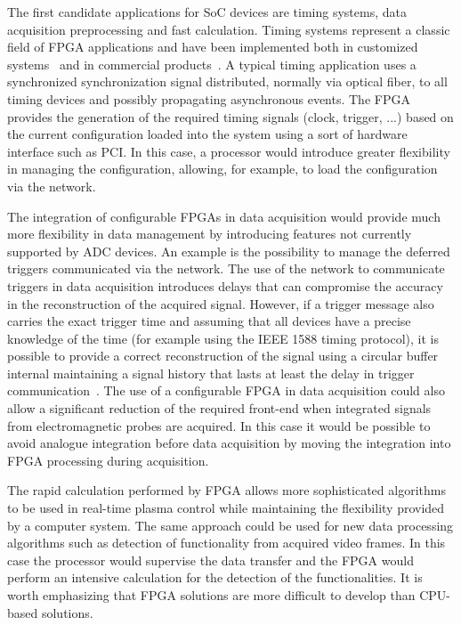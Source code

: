 The first candidate applications for SoC devices are timing systems, data acquisition preprocessing and fast calculation. Timing systems represent a classic field of FPGA applications and have been implemented both in customized systems~\cite{ana_9} and in commercial products~\cite{ana_10}. A typical timing application uses a synchronized synchronization signal distributed, normally via optical fiber, to all timing devices and possibly propagating asynchronous events. The FPGA provides the generation of the required timing signals (clock, trigger, ...) based on the current configuration loaded into the system using a sort of hardware interface such as PCI. In this case, a processor would introduce greater flexibility in managing the configuration, allowing, for example, to load the configuration via the network.

The integration of configurable FPGAs in data acquisition would provide much more flexibility in data management by introducing features not currently supported by ADC devices. An example is the possibility to manage the deferred triggers communicated via the network. The use of the network to communicate triggers in data acquisition introduces delays that can compromise the accuracy in the reconstruction of the acquired signal. However, if a trigger message also carries the exact trigger time and assuming that all devices have a precise knowledge of the time (for example using the IEEE 1588 timing protocol), it is possible to provide a correct reconstruction of the signal using a circular buffer internal maintaining a signal history that lasts at least the delay in trigger communication~\cite{ana_11}. The use of a configurable FPGA in data acquisition could also allow a significant reduction of the required front-end when integrated signals from electromagnetic probes are acquired. In this case it would be possible to avoid analogue integration before data acquisition by moving the integration into FPGA processing during acquisition.

The rapid calculation performed by FPGA allows more sophisticated algorithms to be used in real-time plasma control while maintaining the flexibility provided by a computer system. The same approach could be used for new data processing algorithms such as detection of functionality from acquired video frames. In this case the processor would supervise the data transfer and the FPGA would perform an intensive calculation for the detection of the functionalities. It is worth emphasizing that FPGA solutions are more difficult to develop than CPU-based solutions.


